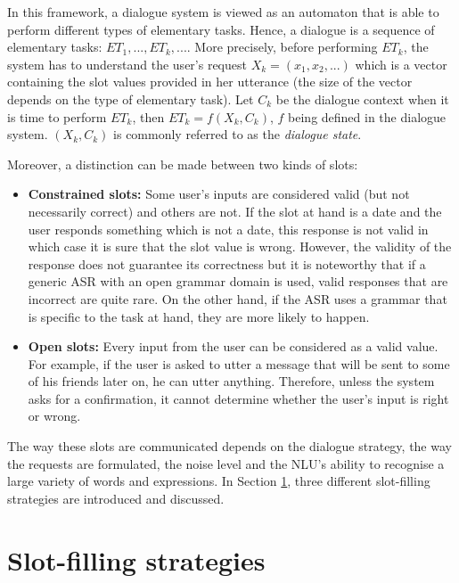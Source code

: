 	In this framework, a dialogue system is viewed as an automaton that is able to perform different types of elementary tasks. Hence, a dialogue is a sequence of elementary tasks: $ET_1,...,ET_k,...$. More precisely,  before performing $ET_k$, the system has to understand the user's request $X_k = (x_1, x_2, ...)$ which is a vector containing the slot values provided in her utterance (the size of the vector depends on the type of elementary task). Let $C_k$ be the dialogue context when it is time to perform $ET_k$, then $ET_k = f(X_k,C_k)$, $f$ being defined in the dialogue system. $(X_k,C_k)$ is commonly referred to as the \textit{dialogue state}.
	
	Moreover, a distinction can be made between two kinds of slots:
	
	\begin{itemize}
		\item \textbf{Constrained slots:} Some user's inputs are considered valid (but not necessarily correct) and others are not. If the slot at hand is a date and the user responds something which is not a date, this response is not valid in which case it is sure that the slot value is wrong. However, the validity of the response does not guarantee its correctness but it is noteworthy that if a generic ASR with an open grammar domain is used, valid responses that are incorrect are quite rare. On the other hand, if the ASR uses a grammar that is specific to the task at hand, they are more likely to happen.
                \item \textbf{Open slots:} Every input from the user can be considered as a valid value. For example, if the user is asked to utter a message that will be sent to some of his friends later on, he can utter anything. Therefore, unless the system asks for a confirmation, it cannot determine whether the user's input is right or wrong.
	\end{itemize}
	
	The way these slots are communicated depends on the dialogue strategy, the way the requests are formulated, the noise level and the NLU's ability to recognise a large variety of words and expressions. In Section \ref{sec:slotfillstrat}, three different slot-filling strategies are introduced and discussed.

\section{Slot-filling strategies}
\label{sec:slotfillstrat}


